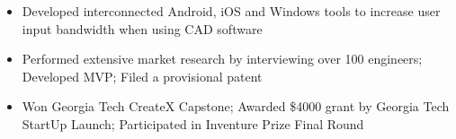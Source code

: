 \documentclass[10pt,letter,ragged2e,withhyper]{altacv}
\begin{document}
\begin{paracol}{2}
\medskip


\begin{itemize}
\item Developed interconnected Android, iOS and Windows tools to increase user input bandwidth when using CAD software
\item Performed extensive market research by interviewing over 100 engineers; Developed MVP; Filed a provisional patent
\item Won Georgia Tech CreateX Capstone; Awarded \$4000 grant by Georgia Tech StartUp Launch; Participated in Inventure Prize Final Round
\end{itemize}



















\end{paracol}
\end{document}
